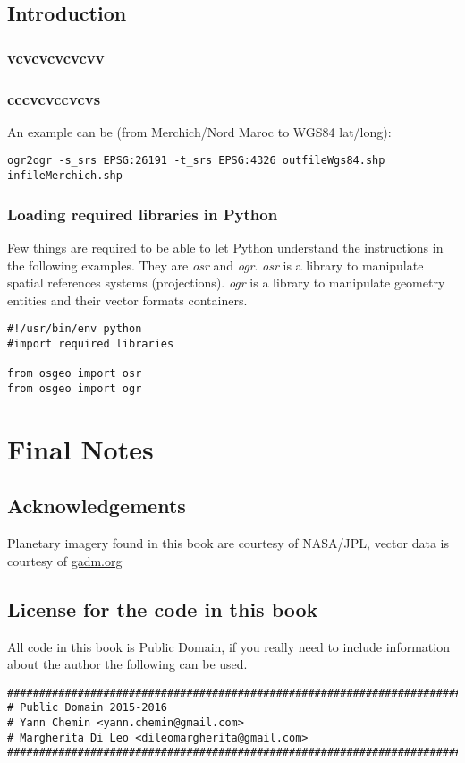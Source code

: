 \documentclass[10pt]{book}
\begin{document}
\section{Introduction}
\subsection{vcvcvcvcvcvv}
\subsection{cccvcvccvcvs}


\noindent An example can be (from Merchich/Nord Maroc to WGS84 lat/long):

\begin{verbatim}
ogr2ogr -s_srs EPSG:26191 -t_srs EPSG:4326 outfileWgs84.shp infileMerchich.shp
\end{verbatim}

\subsection{Loading required libraries in Python}
Few things are required to be able to let Python understand the instructions in the following examples. 
They are {\it osr} and {\it ogr}. {\it osr} is a library to manipulate spatial references systems (projections).
{\it ogr} is a library to manipulate geometry entities and their vector formats containers.

\begin{verbatim}
#!/usr/bin/env python
#import required libraries

from osgeo import osr
from osgeo import ogr
\end{verbatim}

\newpage

\newpage


\chapter{Final Notes}

\newpage
\section{Acknowledgements}
Planetary imagery found in this book are courtesy of NASA/JPL, vector data is courtesy of \href{http:/gadm.org}{gadm.org}
\section{License for the code in this book}
All code in this book is Public Domain, if you really need to include information about the author 
the following can be used.
\begin{verbatim}
###############################################################################
# Public Domain 2015-2016
# Yann Chemin <yann.chemin@gmail.com>
# Margherita Di Leo <dileomargherita@gmail.com>
###############################################################################
\end{verbatim}
\end{document}
